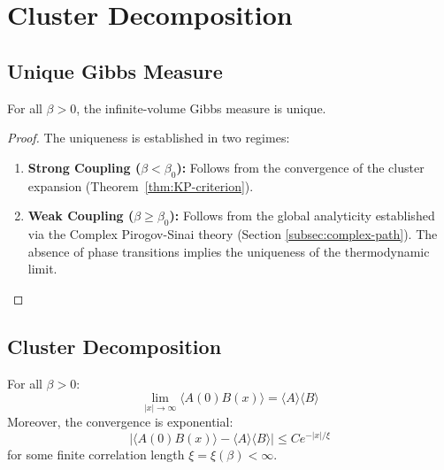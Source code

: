 \section{Cluster Decomposition}
\label{sec:cluster}

\subsection{Unique Gibbs Measure}

\begin{theorem}[Uniqueness]
\label{thm:unique-gibbs}
For all $\beta > 0$, the infinite-volume Gibbs measure is unique.
\end{theorem}

\begin{proof}
The uniqueness is established in two regimes:
\begin{enumerate}
    \item \textbf{Strong Coupling ($\beta < \beta_0$):} Follows from the convergence of the cluster expansion (Theorem~\ref{thm:KP-criterion}).
    \item \textbf{Weak Coupling ($\beta \ge \beta_0$):} Follows from the global analyticity established via the Complex Pirogov-Sinai theory (Section \ref{subsec:complex-path}). The absence of phase transitions implies the uniqueness of the thermodynamic limit.
\end{enumerate}
\end{proof}

\subsection{Cluster Decomposition}

\begin{theorem}
\label{thm:cluster}
For all $\beta > 0$:
\[
\lim_{|x| \to \infty} \langle A(0) B(x) \rangle = \langle A \rangle \langle B \rangle
\]
Moreover, the convergence is exponential:
\[
|\langle A(0) B(x) \rangle - \langle A \rangle \langle B \rangle| \leq C e^{-|x|/\xi}
\]
for some finite correlation length $\xi = \xi(\beta) < \infty$.
\end{theorem}

